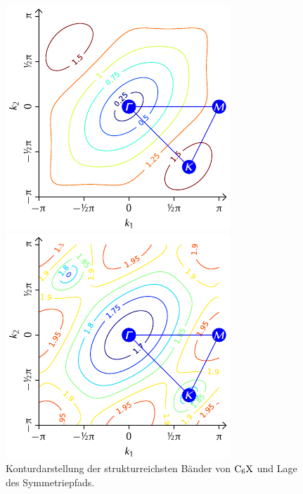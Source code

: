 \documentclass[a4paper, 10pt, twoside, openany]{book} %
\begin{document}
\begin{figure}
    \begin{minipage}[t]{0.48\textwidth}
        \includegraphics[width=\textwidth]{Abbildungen/Bandstrukturen/BZ_C6X_4.pdf}
    \end{minipage}
    \hfill
    \begin{minipage}[t]{0.48\textwidth}
        \includegraphics[width=\textwidth]{Abbildungen/Bandstrukturen/BZ_C6X_5.pdf}
    \end{minipage}
    \caption[Konturdarstellung der Dispersionsrelation von $\rm C_6X$]{Konturdarstellung der strukturreichsten Bänder von $\rm C_6X$ und Lage des Symmetriepfads.}
    \label{C6X Kontur}
\end{figure}
\end{document}
